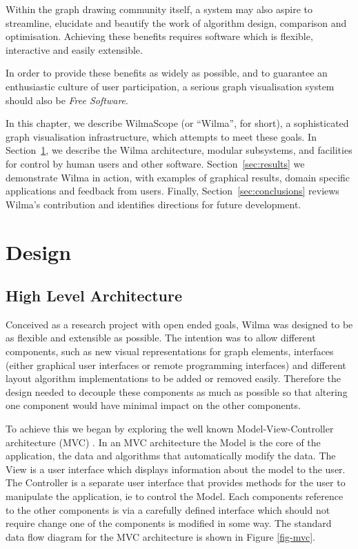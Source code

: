 \documentclass[runningheads]{cl2emult}
\begin{document}
Within the graph drawing community itself, a system may also aspire to 
streamline, elucidate and beautify the work of algorithm design, comparison
and optimisation.  Achieving these benefits requires software which is
flexible, interactive and easily extensible.

In order to provide these benefits as widely as possible, and to guarantee
an enthusiastic culture of user participation, a serious graph visualisation
system should also be {\em Free Software}\cite{stallman92why}.

In this chapter, we describe WilmaScope (or ``Wilma'', for short), a
sophisticated graph visualisation infrastructure, which attempts to meet
these goals.  In Section~\ref{sec:design}, we describe the Wilma
architecture, modular subsystems, and facilities for control by human users
and other software.  Section~\ref{sec:results} we demonstrate Wilma in
action, with examples of graphical results, domain specific applications and
feedback from users.  Finally, Section~\ref{sec:conclusions} reviews Wilma's
contribution and identifies directions for future development.

\section{Design}\label{sec:design}
\subsection{High Level Architecture}
Conceived as a research project with open ended goals, Wilma was
designed to be as flexible and extensible as possible.  The intention
was to allow different components, such as new visual representations
for graph elements, interfaces (either graphical user interfaces or
remote programming interfaces) and different 
layout algorithm implementations to be added or removed easily.
Therefore the design needed to decouple these components as much as
possible so that altering one component would have minimal impact on
the other components.

To achieve this we began by exploring the well known Model-View-Controller
architecture (MVC) \cite{gamma94design}.  In an MVC architecture the Model is the core
of the application, the data and algorithms that automatically modify
the data.  The View is a user interface which displays information
about the model to the user.  The Controller is a separate user
interface that provides methods for the user to manipulate the
application, ie to control the Model.  Each components reference to
the other components is via a carefully defined interface which should
not require change one of the components is modified in some way.  The
standard data flow diagram for the MVC architecture is shown in Figure
\ref{fig-mvc}.
\end{document}
